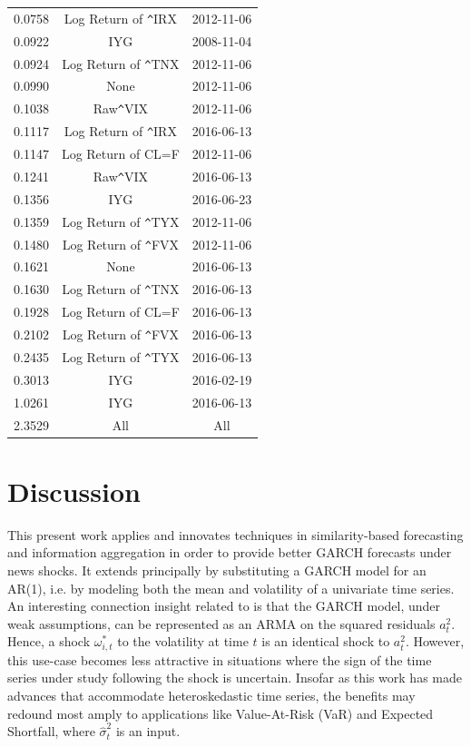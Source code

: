 \documentclass[11pt,3p,review,authoryear]{elsarticle}
\theoremstyle{definition}
\begin{document}
\begin{table}[ht]
\begin{tabular}{ccc}
      0.0758 & Log Return of \verb|^|IRX & 2012-11-06 \\ 
      0.0922 & IYG & 2008-11-04 \\ 
      0.0924 & Log Return of \verb|^|TNX & 2012-11-06 \\ 
      0.0990 & None & 2012-11-06 \\ 
      0.1038 & Raw\verb|^|VIX & 2012-11-06 \\ 
      0.1117 & Log Return of \verb|^|IRX & 2016-06-13 \\ 
      0.1147 & Log Return of CL=F & 2012-11-06 \\ 
      0.1241 & Raw\verb|^|VIX & 2016-06-13 \\ 
      0.1356 & IYG & 2016-06-23 \\ 
      0.1359 & Log Return of \verb|^|TYX & 2012-11-06 \\ 
      0.1480 & Log Return of \verb|^|FVX & 2012-11-06 \\ 
      0.1621 & None & 2016-06-13 \\ 
      0.1630 & Log Return of \verb|^|TNX & 2016-06-13 \\ 
      0.1928 & Log Return of CL=F & 2016-06-13 \\ 
      0.2102 & Log Return of \verb|^|FVX & 2016-06-13 \\ 
      0.2435 & Log Return of \verb|^|TYX & 2016-06-13 \\ 
      0.3013 & IYG & 2016-02-19 \\ 
      1.0261 & IYG & 2016-06-13 \\
      \rowcolor{red} 2.3529 & All & All \\ 
       \hline
    \end{tabular}
    \endgroup
    \end{table}\label{multiverse_table}

\section{Discussion}

This present work applies and innovates techniques in similarity-based forecasting and information aggregation in order to provide better GARCH forecasts under news shocks.  It extends \citet{lin2021minimizing} principally by substituting a GARCH model for an AR(1), i.e. by modeling both the mean and volatility of a univariate time series.  An interesting connection insight related to \citet{lin2021minimizing} is that the GARCH model, under weak assumptions, can be represented as an ARMA on the squared residuals $a^{2}_{t}$.  Hence, a shock $\omega^{*}_{i,t}$ to the volatility at time $t$ is an identical shock to $a^{2}_{t}$. However, this use-case becomes less attractive in situations where the sign of the time series under study following the shock is uncertain.  Insofar as this work has made advances that accommodate heteroskedastic time series, the benefits may redound most amply to applications like Value-At-Risk (VaR) and Expected Shortfall, where $\hat\sigma^{2}_{t}$ is an input.
\end{document}
